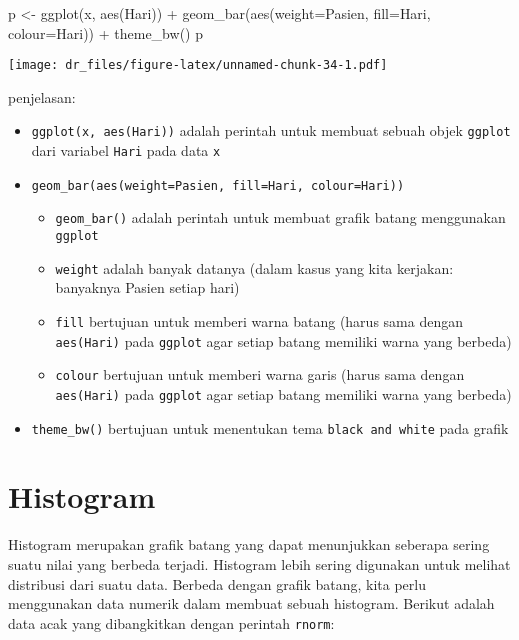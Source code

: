\documentclass[
]{book}
\newenvironment{Shaded}{\begin{snugshade}}{\end{snugshade}}
\newcommand{\AttributeTok}[1]{\textcolor[rgb]{0.77,0.63,0.00}{#1}}
\newcommand{\FunctionTok}[1]{\textcolor[rgb]{0.00,0.00,0.00}{#1}}
\newcommand{\NormalTok}[1]{#1}
\newcommand{\OtherTok}[1]{\textcolor[rgb]{0.56,0.35,0.01}{#1}}
\newcommand{\SpecialCharTok}[1]{\textcolor[rgb]{0.00,0.00,0.00}{#1}}
\providecommand{\tightlist}{%
  \setlength{\itemsep}{0pt}\setlength{\parskip}{0pt}}
\begin{document}
\begin{Shaded}
\begin{Highlighting}[]
\NormalTok{p }\OtherTok{\textless{}{-}} \FunctionTok{ggplot}\NormalTok{(x, }\FunctionTok{aes}\NormalTok{(Hari)) }\SpecialCharTok{+} 
  \FunctionTok{geom\_bar}\NormalTok{(}\FunctionTok{aes}\NormalTok{(}\AttributeTok{weight=}\NormalTok{Pasien, }\AttributeTok{fill=}\NormalTok{Hari, }\AttributeTok{colour=}\NormalTok{Hari)) }\SpecialCharTok{+}
  \FunctionTok{theme\_bw}\NormalTok{()}
\NormalTok{p}
\end{Highlighting}
\end{Shaded}

\texttt{[image: dr\_files/figure-latex/unnamed-chunk-34-1.pdf]}

penjelasan:

\begin{itemize}
\tightlist
\item
  \texttt{ggplot(x,\ aes(Hari))} adalah perintah untuk membuat sebuah objek \texttt{ggplot} dari variabel \texttt{Hari} pada data \texttt{x}
\item
  \texttt{geom\_bar(aes(weight=Pasien,\ fill=Hari,\ colour=Hari))}

  \begin{itemize}
  \tightlist
  \item
    \texttt{geom\_bar()} adalah perintah untuk membuat grafik batang menggunakan \texttt{ggplot}
  \item
    \texttt{weight} adalah banyak datanya (dalam kasus yang kita kerjakan: banyaknya Pasien setiap hari)
  \item
    \texttt{fill} bertujuan untuk memberi warna batang (harus sama dengan \texttt{aes(Hari)} pada \texttt{ggplot} agar setiap batang memiliki warna yang berbeda)
  \item
    \texttt{colour} bertujuan untuk memberi warna garis (harus sama dengan \texttt{aes(Hari)} pada \texttt{ggplot} agar setiap batang memiliki warna yang berbeda)
  \end{itemize}
\item
  \texttt{theme\_bw()} bertujuan untuk menentukan tema \texttt{black\ and\ white} pada grafik
\end{itemize}

\hypertarget{histogram}{%
\section{Histogram}\label{histogram}}

Histogram merupakan grafik batang yang dapat menunjukkan seberapa sering suatu nilai yang berbeda terjadi. Histogram lebih sering digunakan untuk melihat distribusi dari suatu data. Berbeda dengan grafik batang, kita perlu menggunakan data numerik dalam membuat sebuah histogram. Berikut adalah data acak yang dibangkitkan dengan perintah \texttt{rnorm}:
\end{document}
